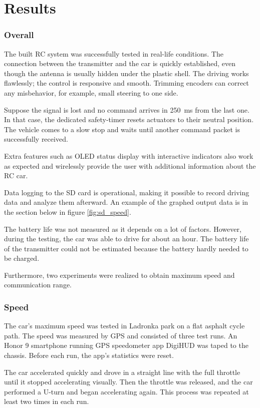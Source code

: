 


\part{Results}
\label{chap:results}
\section{Overall}
The built RC system was successfully tested in real-life conditions. The connection between the transmitter and the car is quickly established, even though the antenna is usually hidden under the plastic shell. The driving works flawlessly; the control is responsive and smooth. Trimming encoders can correct any misbehavior, for example, small steering to one side.

Suppose the signal is lost and no command arrives in \SI{250}{\ms} from the last one. In that case, the dedicated safety-timer resets actuators to their neutral position. The vehicle comes to a slow stop and waits until another command packet is successfully received.

Extra features such as OLED status display with interactive indicators also work as expected and wirelessly provide the user with additional information about the RC car.

Data logging to the SD card is operational, making it possible to record driving data and analyze them afterward. An example of the graphed output data is in the section below in figure \ref{fig:sd_speed}.

The battery life was not measured as it depends on a lot of factors. However, during the testing, the car was able to drive for about an hour. The battery life of the transmitter could not be estimated because the battery hardly needed to be charged.

Furthermore, two experiments were realized to obtain maximum speed and communication range.

\section{Speed}
The car's maximum speed was tested in Ladronka park on a flat asphalt cycle path. The speed was measured by GPS and consisted of three test runs. An Honor 9 smartphone running GPS speedometer app DigiHUD was taped to the chassis. Before each run, the app's statistics were reset.

The car accelerated quickly and drove in a straight line with the full throttle until it stopped accelerating visually. Then the throttle was released, and the car performed a U-turn and began accelerating again. This process was repeated at least two times in each run.


